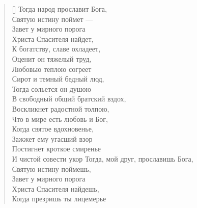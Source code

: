 

\settowidth{\versewidth}{Тогда народ прославит Бога}
\begin{verse}[\versewidth]
Тогда народ прославит Бога,\\ %
Святую истину поймет ---\\
Завет у мирного порога\\
Христа Спасителя найдет,\\
К богатству, славе охладеет,\\
Оценит он тяжелый труд,\\
Любовью теплою согреет\\
Сирот и темный бедный люд,\\
Тогда сольется он душою\\
В свободный общий братский вздох,\\
Воскликнет радостной толпою,\\
Что в мире есть любовь и Бог,\\
Когда святое вдохновенье,\\
Зажжет ему угасший взор\ldotst\\
Постигнет кроткое смиренье\\
И чистой совести укор\ldotst
Тогда, мой друг, прославишь Бога,\\
    Святую истину поймешь, \\
Завет у мирного порога\\
    Христа Спасителя найдешь, \\
Когда презришь ты лицемерье\\

\end{verse}
